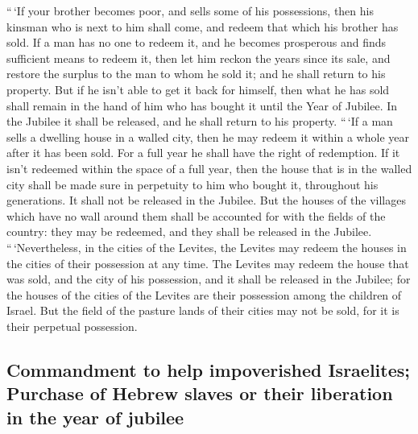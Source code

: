  ``\,`If your brother becomes poor, and sells some of his
possessions, then his kinsman who is next to him shall come, and redeem
that which his brother has sold.  If a man has no one to
redeem it, and he becomes prosperous and finds sufficient means to
redeem it,  then let him reckon the years since its sale,
and restore the surplus to the man to whom he sold it; and he shall
return to his property.  But if he isn't able to get it
back for himself, then what he has sold shall remain in the hand of him
who has bought it until the Year of Jubilee. In the Jubilee it shall be
released, and he shall return to his property.  ``\,`If a
man sells a dwelling house in a walled city, then he may redeem it
within a whole year after it has been sold. For a full year he shall
have the right of redemption.  If it isn't redeemed
within the space of a full year, then the house that is in the walled
city shall be made sure in perpetuity to him who bought it, throughout
his generations. It shall not be released in the Jubilee.
 But the houses of the villages which have no wall around
them shall be accounted for with the fields of the country: they may be
redeemed, and they shall be released in the Jubilee. 
``\,`Nevertheless, in the cities of the Levites, the Levites may redeem
the houses in the cities of their possession at any time.
 The Levites may redeem the house that was sold, and the
city of his possession, and it shall be released in the Jubilee; for the
houses of the cities of the Levites are their possession among the
children of Israel.  But the field of the pasture lands
of their cities may not be sold, for it is their perpetual possession.

\hypertarget{commandment-to-help-impoverished-israelites-purchase-of-hebrew-slaves-or-their-liberation-in-the-year-of-jubilee}{%
\subsection{Commandment to help impoverished Israelites; Purchase of
Hebrew slaves or their liberation in the year of
jubilee}\label{commandment-to-help-impoverished-israelites-purchase-of-hebrew-slaves-or-their-liberation-in-the-year-of-jubilee}}

